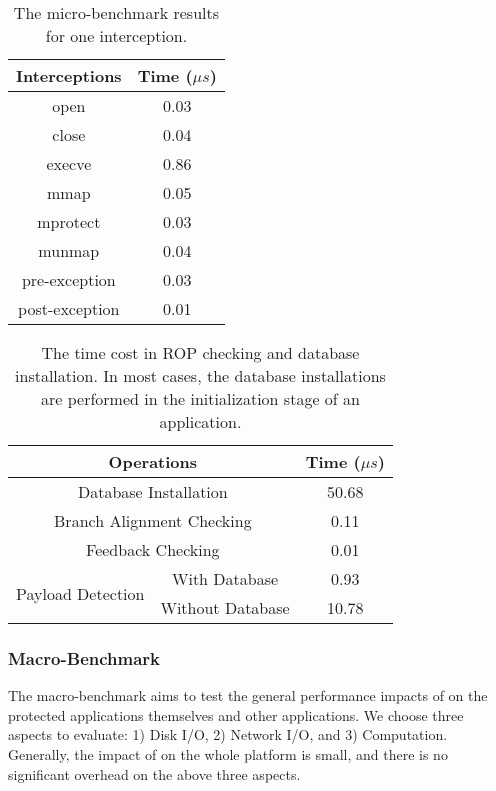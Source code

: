 \begin{table}
  \centering
  \begin{tabular}{|c|c|}
    \hline
    \textbf{Interceptions}         & \textbf{Time} ($\mu s$) \\ \hline
    open                & 0.03 \\ \hline
    close               & 0.04 \\ \hline
    execve              & 0.86 \\ \hline
    mmap                & 0.05 \\ \hline
    mprotect            & 0.03 \\ \hline
    munmap              & 0.04 \\ \hline
    pre-exception       & 0.03 \\ \hline
    post-exception      & 0.01 \\ \hline
  \end{tabular}
  \caption{The micro-benchmark results for one interception. }\label{tab:syscall}
\end{table}


\begin{table}
  \centering
\begin{tabular}{|c|c|c|}\hline
\multicolumn{2}{|c|}{\textbf{Operations}} & \textbf{Time} ($\mu s$)\tabularnewline \hline
\multicolumn{2}{|c|}{Database Installation} & 50.68\tabularnewline \hline
\multicolumn{2}{|c|}{Branch Alignment Checking} & 0.11\tabularnewline \hline
\multicolumn{2}{|c|}{Feedback Checking} & 0.01\tabularnewline \hline
\multirow{2}{*}{Payload Detection} & With Database & 0.93\tabularnewline
\cline{2-3}
            & Without Database & 10.78\tabularnewline \hline
\end{tabular}
  \caption{The time cost in ROP checking and database installation. In most cases, the database installations are performed in the initialization stage of an application.}\label{tab:step}
\end{table}


\subsubsection{Macro-Benchmark}
The macro-benchmark aims to test the general performance impacts of \name on the protected applications themselves and other applications.
We choose three aspects to evaluate: 1) Disk I/O, 2) Network I/O, and 3) Computation. Generally, the impact of \name on the whole platform is small, and there is no significant overhead on the above three aspects.


